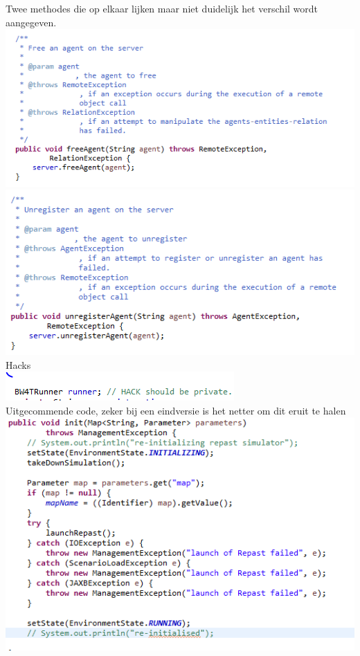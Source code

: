 \documentclass[11pt,a4paper]{article}
\begin{document}
Twee methodes die op elkaar lijken maar niet duidelijk het verschil wordt aangegeven. \\
\includegraphics[width=\linewidth]{freeAgentNoClue.png}
\includegraphics[width=\linewidth]{unregisterAgentNoClue.png} \\ 

Hacks \\
\includegraphics[width=\linewidth]{HackWTF.png} \\ 

Uitgecommende code, zeker bij een eindversie is het netter om dit eruit te halen \\
\includegraphics[width=\linewidth]{lelijkCode.png} \\ 
\end{document}
